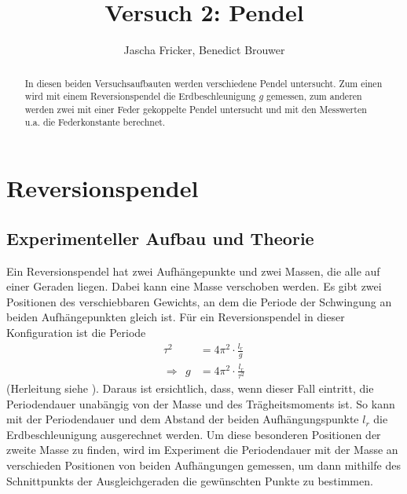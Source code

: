 \documentclass[11pt, a4paper]{article}
\title{Versuch 2: Pendel}
\author{Jascha Fricker, Benedict Brouwer}
\begin{document}
    \maketitle

    

    \begin{abstract}
        In diesen beiden Versuchsaufbauten werden verschiedene Pendel untersucht. Zum einen wird mit
        einem Reversionspendel die Erdbeschleunigung $g$ gemessen, zum anderen werden zwei mit einer Feder
        gekoppelte Pendel untersucht und mit den Messwerten u.a. die Federkonstante berechnet. 
    \end{abstract}

    \tableofcontents

    \newpage

    \section{Reversionspendel}

    \subsection{Experimenteller Aufbau und Theorie}

    Ein Reversionspendel hat zwei Aufhängepunkte und zwei Massen, die alle auf einer Geraden liegen.
    Dabei kann eine Masse verschoben werden.
    Es gibt zwei Positionen des verschiebbaren Gewichts, an dem die Periode der Schwingung an beiden
    Aufhängepunkten gleich ist. Für ein Reversionspendel in dieser Konfiguration ist die Periode
    \begin{align}
         \tau^2 &= 4\pi^2 \cdot \frac{l_r}{g} \\
        \Rightarrow \ \ g &= 4\pi^2 \cdot \frac{l_r}{\tau^2} \label{gformel}
    \end{align}
    (Herleitung siehe \cite[Abschitt 1.3]{pen}). Daraus ist ersichtlich, dass, wenn dieser Fall eintritt, die Periodendauer unabängig von der Masse und des
    Trägheitsmoments ist. So kann mit der Periodendauer und dem Abstand der beiden Aufhängungspunkte $l_r$
    die Erdbeschleunigung ausgerechnet werden.
    Um diese besonderen Positionen der zweite Masse zu finden, wird im Experiment die Periodendauer
    mit der Masse an verschieden Positionen von beiden Aufhängungen gemessen,
    um dann mithilfe des Schnittpunkts der Ausgleichgeraden die gewünschten
    Punkte  zu bestimmen.
\end{document}
